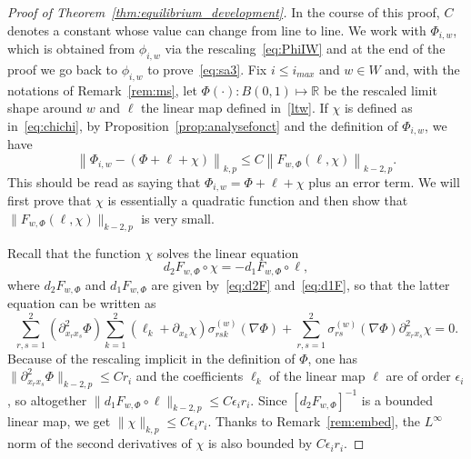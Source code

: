 \documentclass[AHL,Unicode,longabstracts,published]{cedram}
\newcommand{\R}{\mathbb{R}}
\newcommand{\norm}[1]{\lVert #1 \rVert}
\newcommand{\eps}{\epsilon}
\begin{document}
\begin{proof}[Proof of Theorem~\ref{thm:equilibrium_development}]
In the course of this proof, $C$ denotes a constant whose value can change from line to line. We work with $\Phi_{i,w}$, which is obtained from $\phi_{i,w}$ via the rescaling~\eqref{eq:PhiIW} and at the end of the proof we go back to $\phi_{i,w}$ to prove~\eqref{eq:sa3}. Fix $i\le i_{max}$ and $w\in W$ and, with the notations of Remark~\ref{rem:ms}, let $\Phi(\cdot):B(0,1)\mapsto
\R$ be the rescaled limit shape around $w$ and $\ell$ the linear map defined in~\eqref{ltw}. If $\chi$ is defined as in~\eqref{eq:chichi}, by Proposition~\ref{prop:analysefonct} and the definition of $\Phi_{i,w}$, we have
\begin{equation}\label{cucina}
\left\|\Phi_{i,w} -(\Phi + \ell + \chi)\right\|_{{k, p}} \leq C \left\|F_{w,\Phi}(\ell, \chi)\right\|_{{k-2, p}}.
\end{equation}
This should be read as saying that $\Phi_{i,w}=\Phi+\ell+\chi$ plus an error term. We will first prove that $\chi$ is essentially a quadratic function and then show that $\norm{F_{w,\Phi}(\ell, \chi)}_{k-2, p}$ is very small.

Recall that the function $\chi$ solves the linear equation
\begin{equation}
d_2 F_{w, \Phi}\circ \chi = - d_1 F_{w, \Phi}\circ \ell,
\end{equation}
where $d_2F_{w,\Phi}$ and $d_1F_{w,\Phi}$ are given by~\eqref{eq:d2F} and~\eqref{eq:d1F}, so that the latter equation can be written as
\begin{equation}\label{eq:chi}
\sum_{r,s=1}^2\left(\partial^2_{x_r x_s}\Phi\right)\sum_{k=1}^2(\ell_k+\partial_{x_k}\chi)\sigma^{(w)}_{rsk}(\nabla\Phi)+\sum_{r,s=1}^2\sigma^{(w)}_{rs}(\nabla\Phi)\partial^2_{x_r x_s}\chi=0.
\end{equation}
Because of the rescaling implicit in the definition of $\Phi$, one has $\norm{\partial^2_{x_r x_s} \Phi}_{{k-2, p}} \leq C r_i$ and the coefficients $\ell_k$ of the linear map $\ell $ are of order $\eps_i$, so altogether $\norm{d_1 F_{w,\Phi}
\circ \ell}_{{k-2, p}} \leq C \eps_i r_i$. Since $[d_2 F_{w,\Phi}]^{-1}$ is a bounded linear map, we get $\norm{\chi}_{{k, p}} \leq C \eps_i r_i$. Thanks to
Remark~\ref{rem:embed}, the $L^\infty$ norm of the second derivatives of $\chi$ is also bounded by $C \eps_i r_i$.


\end{proof}
\end{document}
